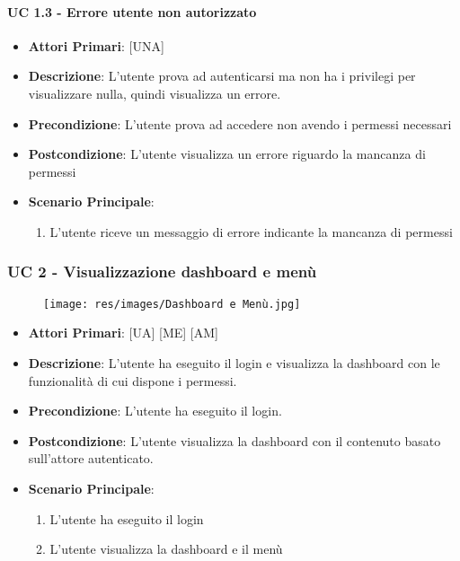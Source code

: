 			\paragraph{UC 1.3 - Errore utente non autorizzato}
			\begin{itemize}
				\item \textbf{Attori Primari}: [UNA]
				\item \textbf{Descrizione}: L'utente prova ad autenticarsi ma non ha i privilegi per visualizzare nulla, quindi visualizza un errore.
				\item \textbf{Precondizione}: L'utente prova ad accedere non avendo i permessi necessari
				\item \textbf{Postcondizione}: L'utente visualizza un errore riguardo la mancanza di permessi
				\item \textbf{Scenario Principale}:
				\begin{enumerate}
					\item{L'utente riceve un messaggio di errore indicante la mancanza di permessi}
				\end{enumerate}	
			\end{itemize}
		
		\subsubsection{UC 2 - Visualizzazione dashboard e menù}
		
		\begin{figure}[t!]
			\centering
			\texttt{[image: res/images/Dashboard e Menù.jpg]}
		\end{figure}
		
		\begin{itemize}
			\item \textbf{Attori Primari}: [UA] [ME] [AM]
			\item \textbf{Descrizione}: L'utente ha eseguito il login e visualizza la dashboard con le funzionalità di cui dispone i permessi.
			\item \textbf{Precondizione}: L'utente ha eseguito il login.
			\item \textbf{Postcondizione}: L'utente visualizza la dashboard con il contenuto basato sull'attore autenticato.
			\item \textbf{Scenario Principale}:
			\begin{enumerate}
				\item{L'utente ha eseguito il login}
				\item{L'utente visualizza la dashboard e il menù}
			\end{enumerate}	
		\end{itemize}

